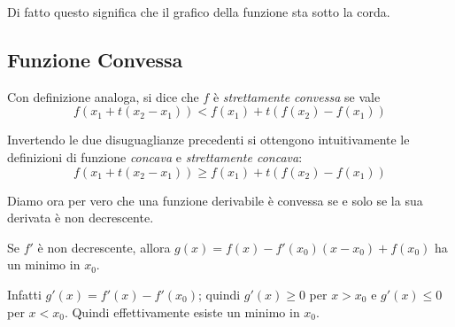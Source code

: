 \begin{center}
\end{center}

Di fatto questo significa che il grafico della funzione sta sotto la corda.

\subsection{Funzione Convessa}

Con definizione analoga, si dice che $f$ è \emph{strettamente convessa} se vale
\begin{equation*}
f(x_1 + t(x_2-x_1)) < f(x_1) + t(f(x_2)-f(x_1))
\end{equation*}

Invertendo le due disuguaglianze precedenti si ottengono intuitivamente le definizioni di funzione \emph{concava} e \emph{strettamente concava}:
\begin{equation*}
f(x_1 + t(x_2-x_1)) \ge f(x_1) + t(f(x_2)-f(x_1))
\end{equation*}

\begin{center}
\end{center}

Diamo ora per vero che una funzione derivabile è convessa se e solo se la sua derivata è non decrescente.

Se $f'$ è non decrescente, allora $g(x) = f(x)-f'(x_0)(x-x_0) + f(x_0)$ ha un minimo in $x_0$.

Infatti $g'(x) = f'(x)-f'(x_0)$; quindi $g'(x) \ge 0$ per $x > x_0$ e $g'(x) \le 0$ per $x < x_0$. Quindi effettivamente esiste un minimo in $x_0$.

\begin{center}
\end{center}

